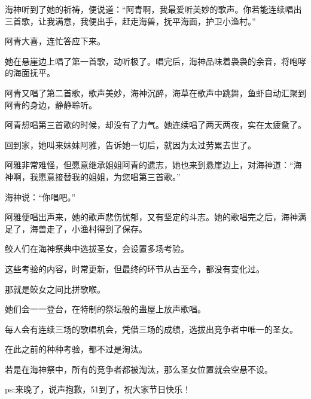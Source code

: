 \begin{this_body}
海神听到了她的祈祷，便说道：“阿青啊，我最爱听美妙的歌声。你若能连续唱出三首歌，让我满意，我便出手，赶走海兽，抚平海面，护卫小渔村。”

阿青大喜，连忙答应下来。

她在悬崖边上唱了第一首歌，动听极了。唱完后，海神品味着袅袅的余音，将咆哮的海面抚平。

阿青又唱了第二首歌，歌声美妙，海神沉醉，海草在歌声中跳舞，鱼虾自动汇聚到阿青的身边，静静聆听。

阿青想唱第三首歌的时候，却没有了力气。她连续唱了两天两夜，实在太疲惫了。

回到家，她叫来妹妹阿雅，告诉她一切后，就因为太过劳累去世了。

阿雅非常难怪，但愿意继承姐姐阿青的遗志，她也来到悬崖边上，对海神道：“海神啊，我愿意接替我的姐姐，为您唱第三首歌。”

海神说：“你唱吧。”

阿雅便唱出声来，她的歌声悲伤忧郁，又有坚定的斗志。她的歌唱完之后，海神满足了，海兽走了，小渔村得到了保存。

鲛人们在海神祭典中选拔圣女，会设置多场考验。

这些考验的内容，时常更新，但最终的环节从古至今，都没有变化过。

那就是鲛女之间比拼歌喉。

她们会一一登台，在特制的祭坛般的蛊屋上放声歌唱。

每人会有连续三场的歌唱机会，凭借三场的成绩，选拔出竞争者中唯一的圣女。

在此之前的种种考验，都不过是淘汰。

若是在海神祭中，所有的竞争者都被淘汰，那么圣女位置就会空悬不设。

ps:来晚了，说声抱歉，51到了，祝大家节日快乐！

\end{this_body}

